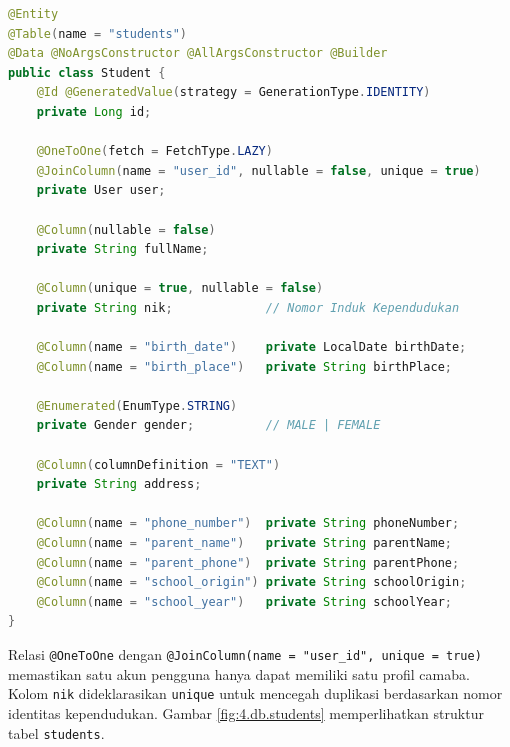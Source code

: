 \begin{lstlisting}[language=Java, caption={Entitas Student dengan relasi One-to-One ke entitas User}, label={kode:4.entitas_student}]
@Entity
@Table(name = "students")
@Data @NoArgsConstructor @AllArgsConstructor @Builder
public class Student {
    @Id @GeneratedValue(strategy = GenerationType.IDENTITY)
    private Long id;

    @OneToOne(fetch = FetchType.LAZY)
    @JoinColumn(name = "user_id", nullable = false, unique = true)
    private User user;

    @Column(nullable = false)
    private String fullName;

    @Column(unique = true, nullable = false)
    private String nik;             // Nomor Induk Kependudukan

    @Column(name = "birth_date")    private LocalDate birthDate;
    @Column(name = "birth_place")   private String birthPlace;

    @Enumerated(EnumType.STRING)
    private Gender gender;          // MALE | FEMALE

    @Column(columnDefinition = "TEXT")
    private String address;

    @Column(name = "phone_number")  private String phoneNumber;
    @Column(name = "parent_name")   private String parentName;
    @Column(name = "parent_phone")  private String parentPhone;
    @Column(name = "school_origin") private String schoolOrigin;
    @Column(name = "school_year")   private String schoolYear;
}
\end{lstlisting}

Relasi \texttt{@OneToOne} dengan \texttt{@JoinColumn(name = "user\_id", unique = true)} memastikan satu akun pengguna hanya dapat memiliki satu profil camaba. Kolom \texttt{nik} dideklarasikan \texttt{unique} untuk mencegah duplikasi berdasarkan nomor identitas kependudukan. Gambar \ref{fig:4.db.students} memperlihatkan struktur tabel \texttt{students}.\par

